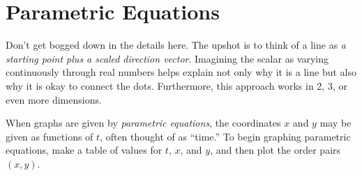 
\newpage

\section{Parametric Equations}

\begin{teachingnote}
Don't get bogged down in the details here.  The upshot is to think of a line as \emph{a starting point plus a scaled direction vector}.  Imagining the scalar as varying continuously through real numbers helps explain not only why it is a line but also why it is okay to connect the dots.  Furthermore, this approach works in 2, 3, or even more dimensions.  
\end{teachingnote}


%

\begin{definition}
When graphs are given by \emph{parametric equations}, the coordinates $x$ and $y$ may be given as functions of $t$, often thought of as ``time.''  To begin graphing parametric equations, make a table of values for $t$, $x$, and $y$, and then plot the order pairs $(x, y)$.  
\end{definition}

